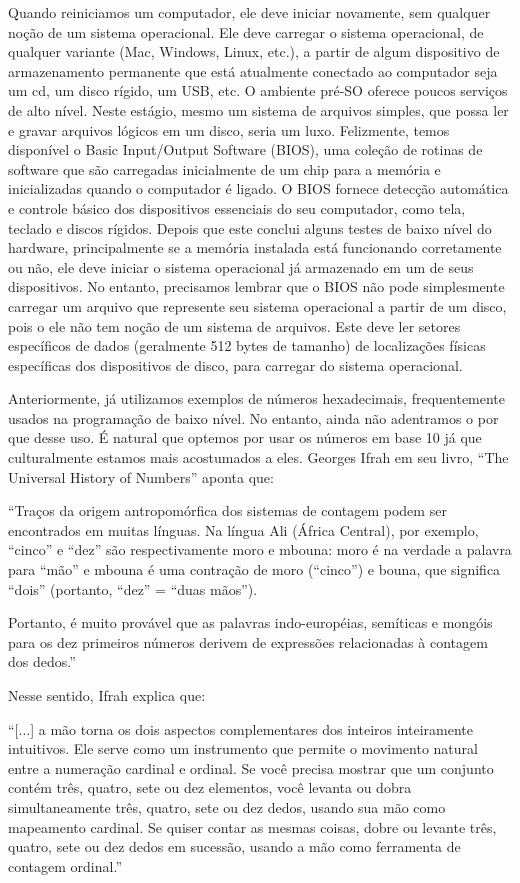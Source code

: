 Quando reiniciamos um computador, ele deve iniciar novamente, sem qualquer noção de um sistema operacional. Ele deve carregar o sistema operacional, de qualquer variante (Mac, Windows, Linux, etc.), a partir de algum dispositivo de armazenamento permanente que está atualmente conectado ao computador seja um cd, um disco rígido, um USB, etc. O ambiente pré-SO oferece poucos serviços de alto nível. Neste estágio, mesmo um sistema de arquivos simples, que possa ler e gravar arquivos lógicos em um disco, seria um luxo. Felizmente, temos disponível o Basic Input/Output Software (BIOS), uma coleção de rotinas de software que são carregadas inicialmente de um chip para a memória e inicializadas quando o computador é ligado. O BIOS fornece detecção automática e controle básico dos dispositivos essenciais do seu computador, como tela, teclado e discos rígidos. Depois que este conclui alguns testes de baixo nível do hardware, principalmente se a memória instalada está funcionando corretamente ou não, ele deve iniciar o sistema operacional já armazenado em um de seus dispositivos. No entanto, precisamos lembrar que o BIOS não pode simplesmente carregar um arquivo que represente seu sistema operacional a partir de um disco, pois o ele não tem noção de um sistema de arquivos. Este deve ler setores específicos de dados (geralmente 512 bytes de tamanho) de localizações físicas específicas dos dispositivos de disco, para carregar do sistema operacional.

Anteriormente, já utilizamos exemplos de números hexadecimais, frequentemente usados na programação de baixo nível. No entanto, ainda não adentramos o por que desse uso. É natural que optemos por usar os números em base 10 já que culturalmente estamos mais acostumados a eles. Georges Ifrah em seu livro, ``The Universal History of Numbers'' \cite{14} aponta que:

``Traços da origem antropomórfica dos sistemas de contagem podem ser encontrados em muitas línguas. Na língua Ali (África Central), por exemplo, ``cinco'' e ``dez'' são respectivamente moro e mbouna: moro é na verdade a palavra para ``mão'' e mbouna é uma contração de moro (``cinco'') e bouna, que significa ``dois'' (portanto, ``dez'' = ``duas mãos'').

Portanto, é muito provável que as palavras indo-européias, semíticas e mongóis para os dez primeiros números derivem de expressões relacionadas à contagem dos dedos.''

Nesse sentido, Ifrah explica que:

``[...] a mão torna os dois aspectos complementares dos inteiros inteiramente intuitivos. Ele serve como um instrumento que permite o movimento natural entre a numeração cardinal e ordinal. Se você precisa mostrar que um conjunto contém três, quatro, sete ou dez elementos, você levanta ou dobra simultaneamente três, quatro, sete ou dez dedos, usando sua mão como mapeamento cardinal. Se quiser contar as mesmas coisas, dobre ou levante três, quatro, sete ou dez dedos em sucessão, usando a mão como ferramenta de contagem ordinal.''

